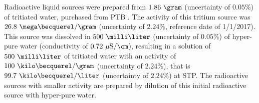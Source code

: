 Radioactive liquid sources were prepared from $1.86~\gram$ (uncertainty of $0.05\%$) of tritiated water, purchased from PTB \cite{PTB}. The activity of this tritium source was $26.8~\mega\becquerel/\gram$ (uncertainty of $2.24\%$, reference date of 1/1/2017). This source was dissolved in $500~\milli\liter$ (uncertainty of $0.05\%$) of hyper-pure water (conductivity of $0.72~\mu\text{S}/\cm$), resulting in a solution of $500~\milli\liter$ of tritiated water with an activity of $100~\kilo\becquerel/\gram$ (uncertainty of $2.24\%$), that is $99.7~\kilo\becquerel/\liter$ (uncertainty of $2.24\%$) at STP. The radioactive sources with smaller activity are prepared by dilution of this initial radioactive source with hyper-pure water.


